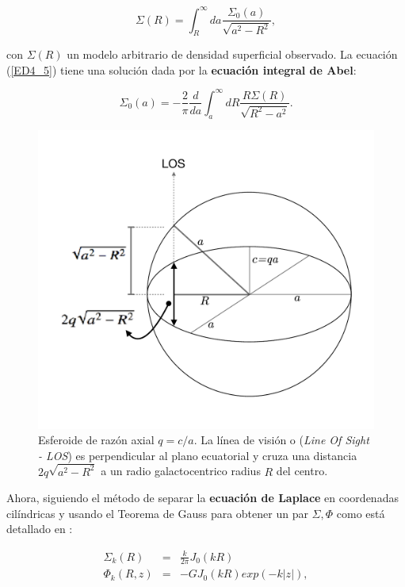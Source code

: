\begin{equation}
\label{ED4_5}
\Sigma (R) = \int_R^\infty da \frac{\Sigma_0(a)}{\sqrt{a^2-R^2}}, \end{equation}

con  $\Sigma(R)$ un modelo arbitrario de densidad superficial observado. La ecuación (\ref{ED4_5}) tiene una solución dada por la \textbf{ecuación integral de Abel}:

\begin{equation}
\label{ED5}
\Sigma_0(a) = -\frac{2}{\pi} \frac{d}{da} \int_a^{\infty} dR \frac{R\Sigma (R)}{\sqrt{R^2-a^2}}.
\end{equation}

\begin{figure}
  \centering
    \includegraphics[width=0.95\columnwidth]{Kap2/galaxy_spheroid.pdf}
  \caption{ Esferoide de razón axial $q=c/a$. La línea de visión o (\emph{Line Of Sight - LOS}) es perpendicular al plano ecuatorial y cruza una distancia $2q\sqrt{a^2-R^2}$ a un radio galactocentrico radius $R$ del centro.}
  \label{fig:Fig_Galaxy_Spheroid}
\end{figure}

Ahora, siguiendo el método de separar la \textbf{ecuación de Laplace} en coordenadas cilíndricas y usando el Teorema de Gauss para obtener un par $\Sigma, \Phi$ como está detallado en \cite{C93}:

\begin{eqnarray*}
\Sigma_k (R) &=& \frac{k}{2\pi} J_0 (kR) \\
\Phi_k (R,z) &=& -G J_0(kR) exp(-k|z| ),
\end{eqnarray*}

